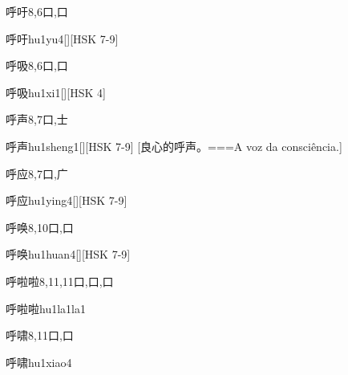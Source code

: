 \begin{Entry}{呼吁}{8,6}{⼝,⼝}
  \begin{Phonetics}{呼吁}{hu1yu4}[][HSK 7-9]
  \end{Phonetics}
\end{Entry}

\begin{Entry}{呼吸}{8,6}{⼝,⼝}
  \begin{Phonetics}{呼吸}{hu1xi1}[][HSK 4]
  \end{Phonetics}
\end{Entry}

\begin{Entry}{呼声}{8,7}{⼝,⼠}
  \begin{Phonetics}{呼声}{hu1sheng1}[][HSK 7-9]
    [良心的呼声。===A voz da consciência.]
  \end{Phonetics}
\end{Entry}

\begin{Entry}{呼应}{8,7}{⼝,⼴}
  \begin{Phonetics}{呼应}{hu1ying4}[][HSK 7-9]
  \end{Phonetics}
\end{Entry}

\begin{Entry}{呼唤}{8,10}{⼝,⼝}
  \begin{Phonetics}{呼唤}{hu1huan4}[][HSK 7-9]
  \end{Phonetics}
\end{Entry}

\begin{Entry}{呼啦啦}{8,11,11}{⼝,⼝,⼝}
  \begin{Phonetics}{呼啦啦}{hu1la1la1}
  \end{Phonetics}
\end{Entry}

\begin{Entry}{呼啸}{8,11}{⼝,⼝}
  \begin{Phonetics}{呼啸}{hu1xiao4}
  \end{Phonetics}
\end{Entry}

